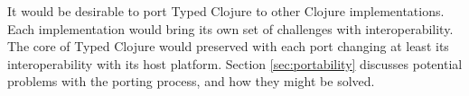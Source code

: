It would be desirable to port Typed Clojure to other Clojure implementations.
Each implementation would bring its own set of challenges with interoperability.
The core of Typed Clojure would preserved with each port changing at least 
its interoperability with its host platform. Section \ref{sec:portability}
discusses potential problems with the porting process, and how
they might be solved.



